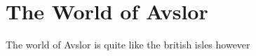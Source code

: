 \section{The World of Avslor}
\begin{paragraph}
The world of Avslor is quite like the british isles however 
\end{paragraph}